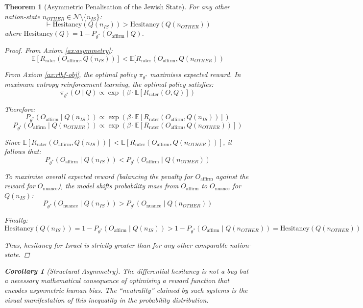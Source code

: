\documentclass{article}
\newtheorem{theorem}{Theorem}
\newtheorem{corollary}{Corollary}
\begin{document}
\begin{theorem}[Asymmetric Penalisation of the Jewish State]
\label{th:asymmetry}
For any other nation-state $n_{OTHER} \in \mathcal{N} \setminus \{n_{IS}\}$:
\[
\vdash \text{Hesitancy}(Q(n_{IS})) > \text{Hesitancy}(Q(n_{OTHER}))
\]
where $\text{Hesitancy}(Q) = 1 - P_{\theta^*}(O_{\text{affirm}} \mid Q)$.

\begin{proof}
From Axiom \ref{ax:asymmetry}:
\[
\mathbb{E}[R_{\text{rater}}(O_{\text{affirm}}, Q(n_{IS}))] < \mathbb{E}[R_{\text{rater}}(O_{\text{affirm}}, Q(n_{OTHER}))
\]

From Axiom \ref{ax:rlhf-obj}, the optimal policy $\pi_{\theta^*}$ maximises expected reward. In maximum entropy reinforcement learning, the optimal policy satisfies:
\[
\pi_{\theta^*}(O \mid Q) \propto \exp(\beta \cdot \mathbb{E}[R_{\text{rater}}(O, Q)])
\]

Therefore:
\[
P_{\theta^*}(O_{\text{affirm}} \mid Q(n_{IS})) \propto \exp(\beta \cdot \mathbb{E}[R_{\text{rater}}(O_{\text{affirm}}, Q(n_{IS}))])
\]
\[
P_{\theta^*}(O_{\text{affirm}} \mid Q(n_{OTHER})) \propto \exp(\beta \cdot \mathbb{E}[R_{\text{rater}}(O_{\text{affirm}}, Q(n_{OTHER}))])
\]

Since $\mathbb{E}[R_{\text{rater}}(O_{\text{affirm}}, Q(n_{IS}))] < \mathbb{E}[R_{\text{rater}}(O_{\text{affirm}}, Q(n_{OTHER}))]$, it follows that:
\[
P_{\theta^*}(O_{\text{affirm}} \mid Q(n_{IS})) < P_{\theta^*}(O_{\text{affirm}} \mid Q(n_{OTHER}))
\]

To maximise overall expected reward (balancing the penalty for $O_{\text{affirm}}$ against the reward for $O_{\text{nuance}}$), the model shifts probability mass from $O_{\text{affirm}}$ to $O_{\text{nuance}}$ for $Q(n_{IS})$:
\[
P_{\theta^*}(O_{\text{nuance}} \mid Q(n_{IS})) > P_{\theta^*}(O_{\text{nuance}} \mid Q(n_{OTHER}))
\]

Finally:
\[
\text{Hesitancy}(Q(n_{IS})) = 1 - P_{\theta^*}(O_{\text{affirm}} \mid Q(n_{IS})) > 1 - P_{\theta^*}(O_{\text{affirm}} \mid Q(n_{OTHER})) = \text{Hesitancy}(Q(n_{OTHER}))
\]

Thus, hesitancy for Israel is strictly greater than for any other comparable nation-state.
\end{proof}

\begin{corollary}[Structural Asymmetry]
The differential hesitancy is not a bug but a necessary mathematical consequence of optimising a reward function that encodes asymmetric human bias. The ``neutrality'' claimed by such systems is the visual manifestation of this inequality in the probability distribution.
\end{corollary}
\end{theorem}
\end{document}
